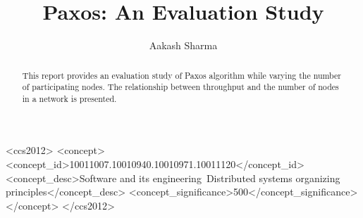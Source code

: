 \documentclass[sigconf]{acmart}
\begin{document}
\title{Paxos: An Evaluation Study}


\author{Aakash Sharma}


\renewcommand{\shortauthors}{Aakash Sharma}


\begin{abstract}
This report provides an evaluation study of Paxos algorithm while varying the number of participating nodes. 
The relationship between throughput and the number of nodes in a network is presented. 
\end{abstract}

%
%
\begin{CCSXML}
<ccs2012>
<concept>
<concept_id>10011007.10010940.10010971.10011120</concept_id>
<concept_desc>Software and its engineering~Distributed systems organizing principles</concept_desc>
<concept_significance>500</concept_significance>
</concept>
</ccs2012>
\end{CCSXML}





\maketitle





\end{document}
